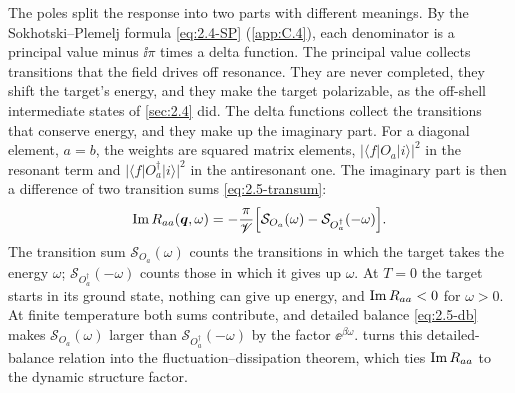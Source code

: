 The poles split the response into two parts with different meanings. By the Sokhotski--Plemelj formula \cref{eq:2.4-SP} (\cref{app:C.4}), each denominator is a principal value minus $\ii\pi$ times a delta function. The principal value collects transitions that the field drives off resonance. They are never completed, they shift the target's energy, and they make the target polarizable, as the off-shell intermediate states of \cref{sec:2.4} did. The delta functions collect the transitions that conserve energy, and they make up the imaginary part. For a diagonal element, $a = b$, the weights are squared matrix elements, $|\langle f|O_a|i\rangle|^2$ in the resonant term and $|\langle f|O_a^\dagger|i\rangle|^2$ in the antiresonant one. The imaginary part is then a difference of two transition sums \cref{eq:2.5-transum}:
\begin{equation}
  \operatorname{Im} R_{aa}(\bm{q},\omega) = -\frac{\pi}{\mathscr{V}}\Bigl[\mathcal{S}_{O_a}(\omega) - \mathcal{S}_{O_a^\dagger}(-\omega)\Bigr] .
  \label{eq:4.1-ImR}
\end{equation}
The transition sum $\mathcal{S}_{O_a}(\omega)$ counts the transitions in which the target takes the energy $\omega$; $\mathcal{S}_{O_a^\dagger}(-\omega)$ counts those in which it gives up $\omega$. At $T = 0$ the target starts in its ground state, nothing can give up energy, and $\operatorname{Im} R_{aa} < 0$ for $\omega > 0$. At finite temperature both sums contribute, and detailed balance \cref{eq:2.5-db} makes $\mathcal{S}_{O_a}(\omega)$ larger than $\mathcal{S}_{O_a^\dagger}(-\omega)$ by the factor $\ee^{\beta\omega}$.  turns this detailed-balance relation into the fluctuation--dissipation theorem, which ties $\operatorname{Im} R_{aa}$ to the dynamic structure factor.

